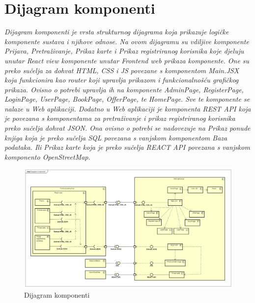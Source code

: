 		\section{Dijagram komponenti}
		
			\textit{Dijagram komponenti je vrsta strukturnog dijagrama koja prikazuje logičke komponente sustava i njihove odnose. Na ovom dijagramu su vdiljive komponente Prijava, Pretraživanje, Prikaz karte i Prikaz registriranog korisnika koje djeluju unutar React view komponente unutar Frontend web prikaza komponente. One su preko sučelja za dohvat HTML, CSS i JS povezane s komponentom Main.JSX koja funkcionira kao router koji upravlja prikazom i funkcionalnošću grafičkog prikaza. Ovisno o potrebi upravlja ih na komponente AdminPage, RegisterPage, LoginPage, UserPage, BookPage, OfferPage, te HomePage. Sve te komponente se nalaze u Web aplikaciji. Dodatno u Web aplikaciji je komponenta REST API koja je povezana s komponentama za pretraživanje i prikaz registriranog korisnika preko sučelja dohvat JSON. Ona ovisno o potrebi se nadovezuje na Prikaz ponude knjiga koja je preko sučelja SQL povezana s vanjskom komponentom Baza podataka. Ili Prikaz karte koja je preko sučelja REACT API povezana s vanjskom komponento OpenStreetMap. }

            \eject
			
			
			\begin{figure}[H]
				\includegraphics[width=\textwidth]{dijagrami/Dijagram komponenti.PNG} %
				\centering
				\caption{Dijagram komponenti }
				\label{fig:dijagramkomponenti1}
			\end{figure}
			
			\eject
